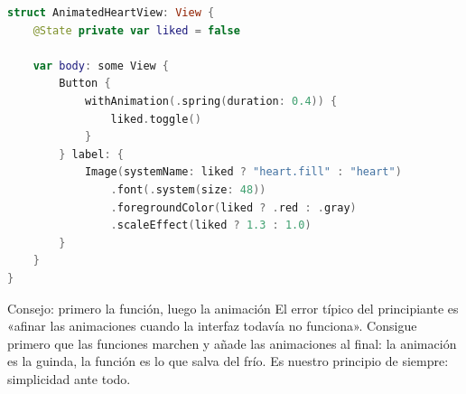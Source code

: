 \begin{lstlisting}[language=Swift]
struct AnimatedHeartView: View {
    @State private var liked = false

    var body: some View {
        Button {
            withAnimation(.spring(duration: 0.4)) {
                liked.toggle()
            }
        } label: {
            Image(systemName: liked ? "heart.fill" : "heart")
                .font(.system(size: 48))
                .foregroundColor(liked ? .red : .gray)
                .scaleEffect(liked ? 1.3 : 1.0)
        }
    }
}
\end{lstlisting}

\begin{tcbinfo}{Consejo: primero la función, luego la animación}
El error típico del principiante es «afinar las animaciones cuando la interfaz todavía no funciona». Consigue primero que las funciones marchen y añade las animaciones al final: la animación es la guinda, la función es lo que salva del frío. Es nuestro principio de siempre: simplicidad ante todo.

\end{tcbinfo}

